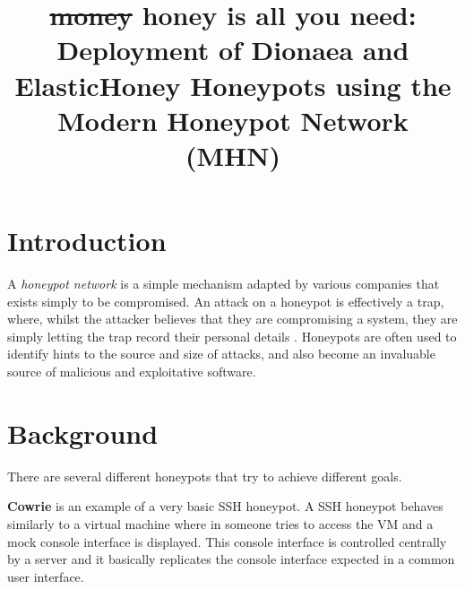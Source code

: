 \documentclass[12pt,usenames,dvipsnames]{iopart}
\begin{document}
\title[Deployment of Dionaea and ElasticHoney Honeypots using the MHN]{\st{money} honey is all you need: Deployment of Dionaea and ElasticHoney Honeypots using the Modern Honeypot Network (MHN)}


\setlength{\parskip}{6pt}
\setlength{\parindent}{25pt}




\section{Introduction} \label{sec-intro}

A \emph{honeypot network} is a simple mechanism adapted by various companies that exists simply to be compromised. An attack on a honeypot is effectively a trap, where, whilst the attacker believes that they are compromising a system, they are simply letting the trap record their personal details \cite{spitzner2003honeynet}. Honeypots are often used to identify hints to the source and size of attacks, and also become an invaluable source of malicious and exploitative software.



\section{Background} \label{sec-background}

There are several different honeypots that try to achieve different goals.

\textbf{Cowrie} is an example of a very basic SSH honeypot. A SSH honeypot behaves similarly to a virtual machine where in someone tries to access the VM and a mock console interface is displayed. This console interface is controlled centrally by a server and it basically replicates the console interface expected in a common user interface.
\end{document}
